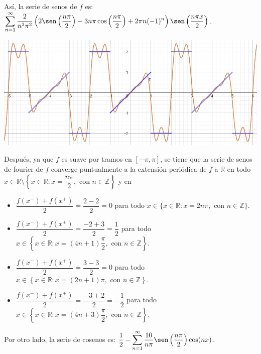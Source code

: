\documentclass[fleqn]{article}
\newcommand{\real}{\mathbb{R}}
\newcommand{\ent}{\mathbb{Z}}
\begin{document}
\begin{enumerate}[I.]
\begin{enumerate}[(1)]
			Así, la serie de senos de $ f $ es: $ \displaystyle \sum_{n=1}^{\infty} \dfrac{2}{n^2 \pi^2} \left( 2 \sen \left( \dfrac{n \pi}{2} \right) - 3n \pi \cos \left( \dfrac{n \pi}{2} \right) + 2 \pi n (-1)^n \right) \sen \left( \dfrac{n \pi x}{2} \right) $.

			\includegraphics[width=0.95\linewidth]{Ejer8s.jpg}

			Después, ya que $f$ es suave por tramos en $ [-\pi,\pi] $, se tiene que la serie de senos de fourier de $f$ converge puntualmente a la extensión periódica de $f$ a $ \real $ en todo $ x \in \real \setminus \left\lbrace x \in \real \colon x = \dfrac{n \pi}{2}, \mbox{ con } n \in \ent \right\rbrace $ y en

			\begin{itemize}
				\item $ \dfrac{f(x^-) + f(x^+)}{2} = \dfrac{2-2}{2} = 0 $ para todo $ x \in \{ x \in \real \colon x = 2n \pi, \mbox{ con } n \in \ent \} $.
				
				\item $ \dfrac{f(x^-) + f(x^+)}{2} = \dfrac{-2+3}{2} = \dfrac{1}{2} $ para todo $ x \in \left\lbrace x \in \real \colon x = (4n + 1) \dfrac{\pi}{2}, \mbox{ con } n \in \ent \right\rbrace $.
				
				\item $ \dfrac{f(x^-) + f(x^+)}{2} = \dfrac{3-3}{2} = 0 $ para todo $ x \in \left\lbrace x \in \real \colon x = (2n + 1) \pi, \mbox{ con } n \in \ent \right\rbrace $.
				
				\item $ \dfrac{f(x^-) + f(x^+)}{2} = \dfrac{-3+2}{2} = -\dfrac{1}{2} $ para todo $ x \in \left\lbrace x \in \real \colon x = (4n + 3) \dfrac{\pi}{2}, \mbox{ con } n \in \ent \right\rbrace $.
			\end{itemize}

			Por otro lado, la serie de cosenos es: $ \displaystyle \dfrac{1}{2} - \sum_{n=1}^{\infty} \dfrac{10}{n \pi} \sen \left( \dfrac{n \pi}{2} \right) \cos (n x) $.


\end{enumerate}
\end{enumerate}
\end{document}
